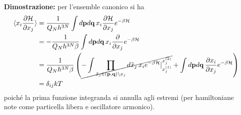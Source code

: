 \documentclass{article}
\begin{document}
\textbf{Dimostrazione:} per l'ensemble canonico si ha 
\begin{align}
    \braket{x_i\frac{\partial\mathcal{H}}{\partial x_j}} &= \frac{1}{Q_Nh^{3N}}\int d\mathbf{p}d\mathbf{q} \, x_i\frac{\partial\mathcal{H}}{\partial x_j}e^{-\beta\mathcal{H}} \notag \\
    &= -\frac{1}{Q_Nh^{3N}\beta}\int d\mathbf{p}d\mathbf{q} \, x_i\frac{\partial}{\partial x_j}e^{-\beta\mathcal{H}} \notag \\
    &= \frac{1}{Q_Nh^{3N}\beta}\left(\cancel{-\int \prod_{\tilde{x}_j \in (\mathbf{p}, \mathbf{q}) \setminus x_j}d\tilde{x}_j \, x_i e^{-\beta\mathcal{H}}|_{x_j^{(1)}}^{x_j^{(2)}}} + \int d\mathbf{p}d\mathbf{q} \, \frac{\partial x_i}{\partial x_j}e^{-\beta\mathcal{H}}\right) \notag \\
    &= \delta_{ij}kT \notag
\end{align}
poiché la prima funzione integranda si annulla agli estremi (per hamiltoniane note come particella libera e oscillatore armonico).

\newpage
\end{document}
